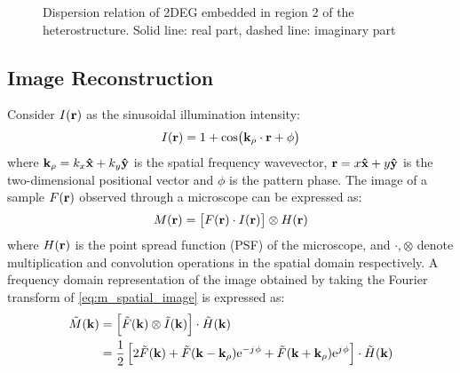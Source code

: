 \documentclass[11pt]{article}
\begin{document}
%
\begin{figure}[t!]
      \hfil
  \caption{Dispersion relation of 2DEG embedded in region 2 of the heterostructure. Solid line: real part, dashed line: imaginary part}
  \label{fig:simulation1}
\end{figure}
%
\subsection{Image Reconstruction}
%
Consider $I(\mathbf{r})$ as the sinusoidal illumination intensity:
%
\begin{equation}
  I(\mathbf{r}) = 1 + \cos(\mathbf{k}_{\rho} \cdot \mathbf{r} + \phi)
  \label{eq:intensity}
\end{equation}
where $\mathbf{k}_{\rho} = k_x \mathbf{\hat{x}} + k_y \mathbf{\hat{y}}$ is the spatial frequency wavevector,  $\mathbf{r} = x \mathbf{\hat{x}} +  y \mathbf{\hat{y}}$ is the two-dimensional positional vector and $\phi$ is the pattern phase. The image of a sample $F(\mathbf{r})$ observed through a microscope can be expressed as:
%
\begin{equation}
  M(\mathbf{r}) = \left[ F(\mathbf{r}) \cdot I(\mathbf{r}) \right] \otimes H(\mathbf{r})
  \label{eq:m_spatial_image}
\end{equation}
%
where $H(\mathbf{r})$ is the point spread function (PSF) of the microscope, and $\cdot, \otimes$ denote multiplication and convolution operations in the spatial domain respectively. A frequency domain representation of the image obtained by taking the Fourier transform of \eqref{eq:m_spatial_image} is expressed as:
%
\begin{equation}
  \begin{split}
    \tilde{M}(\mathbf{k}) &= \left[ \tilde{F}(\mathbf{k}) \otimes \tilde{I}(\mathbf{k}) \right] \cdot \tilde{H}(\mathbf{k}) \\
     &= \frac{1}{2} \left[ 2\tilde{F}(\mathbf{k}) + \tilde{F}(\mathbf{k} - \mathbf{k}_{\rho}) \mathrm{e}^{- j\mkern1mu \phi} + \tilde{F}(\mathbf{k} + \mathbf{k}_{\rho}) \mathrm{e}^{j\mkern1mu \phi} \right] \cdot \tilde{H}(\mathbf{k})
  \end{split}
  \label{eq:m_ft}
\end{equation}
\end{document}
